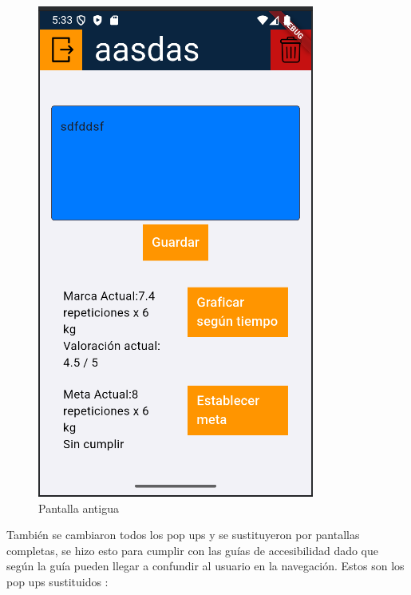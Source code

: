 \begin{figure}[H]
\begin{minipage}[b]{0.45\textwidth}
    \includegraphics[width=\textwidth]{fotos/ejerciciosVieja.png}
    \caption{Pantalla antigua}
    \label{fig:pantalla_vieja}
  \end{minipage}
\end{figure}

También se cambiaron todos los pop ups y se sustituyeron por pantallas completas, se hizo esto para cumplir con las guías de accesibilidad dado que según la guía pueden llegar a confundir al usuario en la navegación. Estos son los pop ups sustituidos :

